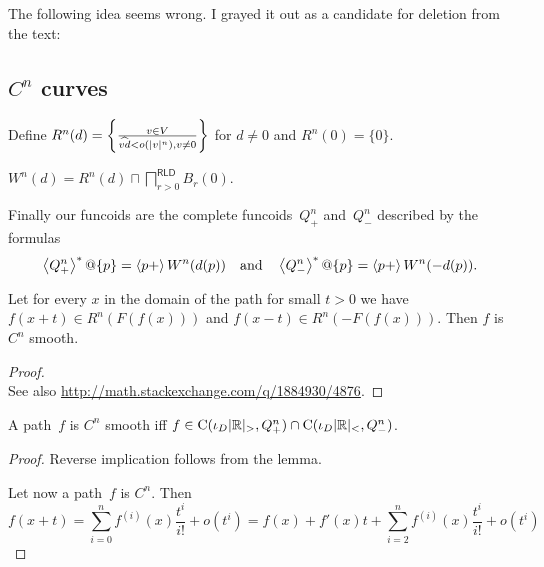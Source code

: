 The following idea seems wrong. I grayed it out as a candidate for deletion from the text:

\begin{grayed}

\subsection{$C^n$ curves}


Define $R^n(d) = \left\{ \frac{v\in V}{\widehat{vd}<o(|v|^n), v\ne 0}\right\}$ for $d\ne 0$ and $R^n(0) = \{0\}$.

\begin{defn}
$W^n(d) = R^n(d) \sqcap \bigsqcap^{\mathsf{RLD}}_{r>0}B_r(0)$.
\end{defn}

Finally our funcoids are the complete funcoids~$Q_+^n$ and~$Q_-^n$ described by the formulas
\[
\left\langle Q_+^n\right\rangle ^{\ast}@\{p\} = \left\langle p+\right\rangle W^n(d(p)) \quad\text{and}\quad \left\langle Q_-^n\right\rangle ^{\ast}@\{p\} = \left\langle p+\right\rangle W^n(-d(p)).
\]

\begin{lem}
Let for every $x$ in the domain of the path for small $t > 0$ we have $f (x + t) \in R^n (F (f (x)))$ and $f (x - t) \in R^n (- F (f (x)))$.
Then $f$ is $C^n$ smooth.
\end{lem}

\begin{proof}
\\
See also \url{http://math.stackexchange.com/q/1884930/4876}.
\end{proof}

\begin{conjecture}
A path~$f$ is $C^n$ smooth iff $f\in\mathrm{C}(\iota_D|\mathbb{R}|_{>},Q_+^n)\cap\mathrm{C}(\iota_D|\mathbb{R}|_{<},Q_-^n)$.
\end{conjecture}

\begin{proof}
Reverse implication follows from the lemma.

Let now a path~$f$ is $C^n$. Then
\[
f(x+t) = \sum_{i=0}^n f^{(i)}(x)\frac{t^i}{i!} + o(t^i) =
f(x)+f'(x)t + \sum_{i=2}^n f^{(i)}(x)\frac{t^i}{i!} + o(t^i)
\]
\end{proof}

\end{grayed}

